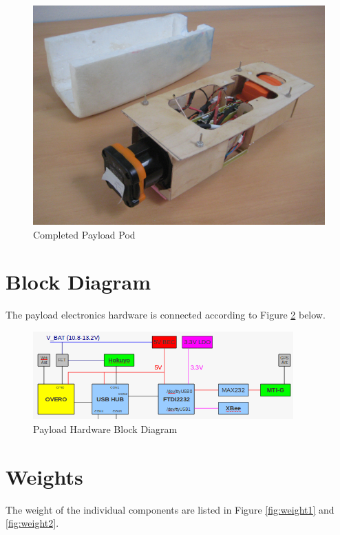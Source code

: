 \documentclass[a4paper,11pt]{report}
\begin{document}
\begin{figure}[ht]
 \centering
 \includegraphics[width=12cm]{./Mentor1_payload2.jpg}
 \caption{Completed Payload Pod}
 \label{fig:payload}
\end{figure}

\section{Block Diagram}

The payload electronics hardware is connected according to Figure \ref{fig:hwdiagram} below.

\begin{figure}[ht]
 \centering
 \includegraphics[width=10cm]{./payload_hardware_block_diagram.png}
 \caption{Payload Hardware Block Diagram}
 \label{fig:hwdiagram}
\end{figure}

\section{Weights}

The weight of the individual components are listed in Figure \ref{fig:weight1} and \ref{fig:weight2}.
\end{document}
